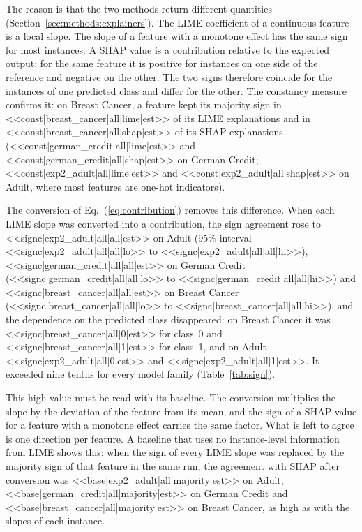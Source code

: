 The reason is that the two methods return different quantities
(Section~\ref{sec:methods:explainers}). The LIME coefficient of a continuous feature is a
local slope. The slope of a feature with a monotone effect has the same sign for most
instances. A SHAP value is a contribution relative to the expected output: for the same
feature it is positive for instances on one side of the reference and negative on the
other. The two signs therefore coincide for the instances of one predicted class and
differ for the other. The constancy measure confirms it: on Breast Cancer, a feature
kept its majority sign in <<const|breast_cancer|all|lime|est>> of its LIME explanations
and in <<const|breast_cancer|all|shap|est>> of its SHAP explanations
(<<const|german_credit|all|lime|est>> and <<const|german_credit|all|shap|est>> on German
Credit; <<const|exp2_adult|all|lime|est>> and <<const|exp2_adult|all|shap|est>> on
Adult, where most features are one-hot indicators).

The conversion of Eq.~(\ref{eq:contribution}) removes this difference. When each LIME
slope was converted into a contribution, the sign agreement rose to
<<signc|exp2_adult|all|all|est>> on Adult (95\% interval
<<signc|exp2_adult|all|all|lo>> to <<signc|exp2_adult|all|all|hi>>),
<<signc|german_credit|all|all|est>> on German Credit
(<<signc|german_credit|all|all|lo>> to <<signc|german_credit|all|all|hi>>) and
<<signc|breast_cancer|all|all|est>> on Breast Cancer
(<<signc|breast_cancer|all|all|lo>> to <<signc|breast_cancer|all|all|hi>>), and the
dependence on the predicted class disappeared: on Breast Cancer it was
<<signc|breast_cancer|all|0|est>> for class~0 and <<signc|breast_cancer|all|1|est>> for
class~1, and on Adult <<signc|exp2_adult|all|0|est>> and
<<signc|exp2_adult|all|1|est>>. It exceeded nine tenths for every model family
(Table~\ref{tab:sign}).

This high value must be read with its baseline. The conversion multiplies the slope by
the deviation of the feature from its mean, and the sign of a SHAP value for a feature
with a monotone effect carries the same factor. What is left to agree is one direction
per feature. A baseline that uses no instance-level information from LIME shows this:
when the sign of every LIME slope was replaced by the majority sign of that feature in
the same run, the agreement with SHAP after conversion was
<<base|exp2_adult|all|majority|est>> on Adult, <<base|german_credit|all|majority|est>> on
German Credit and <<base|breast_cancer|all|majority|est>> on Breast Cancer, as high as with
the slopes of each instance.

